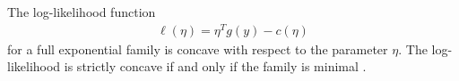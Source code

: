 
\begin{theorem} \label{Thm:loglike concave}
The log-likelihood function
\begin{align*}
	\ell( \eta ) = \eta^T g(y) - c( \eta)
\end{align*}
for a full exponential family is concave with respect to the parameter $\eta$.  The log-likelihood is strictly concave if and only if the family is minimal \citep{Geyer:gdor}.
\end{theorem}


